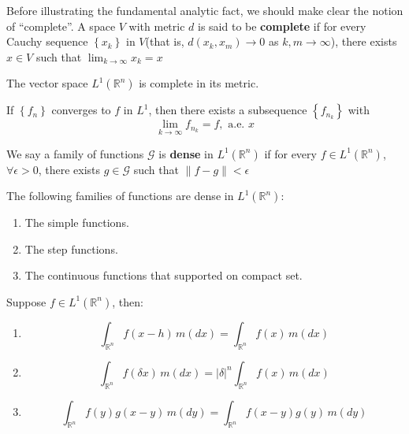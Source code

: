\documentclass{ctexbook}
\begin{document}
Before illustrating the fundamental analytic fact, we should make clear the notion of ``complete''. A space $V$ with metric $d$ is
said to be \textbf{complete} if for every Cauchy sequence $\left\{x_k\right\}$ in $V$(that is, $d(x_k, x_m) \rightarrow 0$ as
$k,m\rightarrow\infty$), there exists $x \in V$ such that $\lim_{k\rightarrow\infty}x_k=x$


\begin{thm}
    The vector space $L^1(\mathbb{R}^n)$ is complete in its metric.
\end{thm}

\begin{cor}
    If $\left\{f_n\right\}$ converges to $f$ in $L^1$, then there exists a subsequence $\left\{f_{n_k}\right\}$ with 
    \[\lim_{k\rightarrow\infty}f_{n_k} = f,\text{ a.e. }x\]
\end{cor}

\begin{define}[dense]
    We say a family of functions $\mathcal{G}$ is \textbf{dense} in $L^1(\mathbb{R}^n)$ if for every $f \in L^1(\mathbb{R}^n)$,
    $\forall \epsilon > 0$, there exists $g \in \mathcal{G}$ such that $\left\lVert f - g\right\rVert < \epsilon$
\end{define}

\begin{thm}
    The following families of functions are dense in $L^1(\mathbb{R}^n)$:
    \begin{enumerate}
        \item The simple functions.
        \item The step functions.
        \item The continuous functions that supported on compact set.
    \end{enumerate}
\end{thm}

\begin{prop}
    Suppose $f \in L^1(\mathbb{R}^n)$, then:
    \begin{enumerate}
        \item \[\int_{\mathbb{R}^n} f(x-h)\,m(dx) = \int_{\mathbb{R}^n} f(x)\,m(dx)\]
        \item \[\int_{\mathbb{R}^n} f(\delta x)\,m(dx) = \left\lvert \delta\right\rvert^n \int_{\mathbb{R}^n} f(x)\, m(dx)\]
        \item \[\int_{\mathbb{R}^n} f(y)g(x-y)\,m(dy) = \int_{\mathbb{R}^n} f(x-y)g(y)\,m(dy)\]
    \end{enumerate}
\end{prop}
\end{document}
